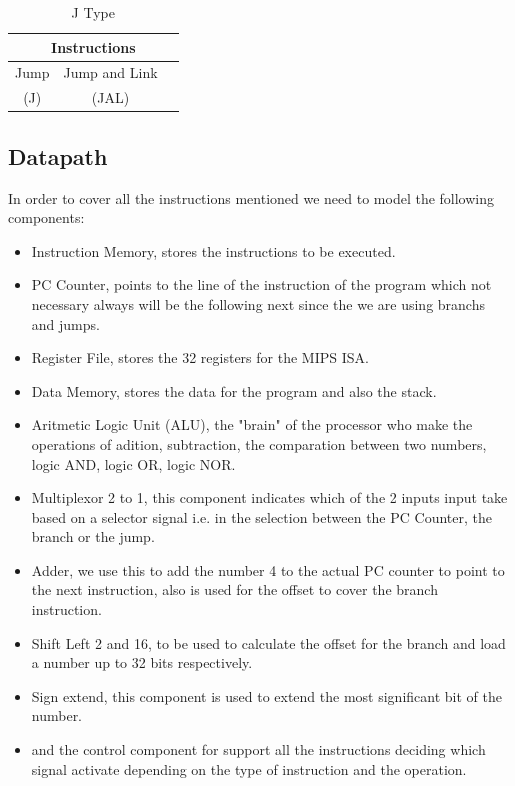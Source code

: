\documentclass[conference]{IEEEtran}
\begin{document}
\begin{table}[htbp]
\caption{J Type} %
\begin{center}
\begin{tabular}{|c|c|c|}
\hline
\multicolumn{3}{|c|}{\textbf{Instructions}} \\
\hline
Jump&Jump and Link&\\
(J) &(JAL)&\\
\hline
\end{tabular}
\label{tab_itype}
\end{center}
\end{table}
\subsection{Datapath}
In order to cover all the instructions mentioned we need to model the following components:

\begin{itemize}
\item Instruction Memory, stores the instructions to be executed.
\item PC Counter, points to the line of the instruction of the program which not 
necessary always will be the following next since the we are using branchs and
jumps.
\item Register File, stores the 32 registers for the MIPS ISA. 
\item Data Memory, stores the data for the program and also the stack.
\item Aritmetic Logic Unit (ALU), the "brain" of the processor who make the operations of
adition, subtraction, the comparation between two numbers, logic AND, logic OR, logic NOR.
\item Multiplexor 2 to 1, this component indicates which of the 2 inputs input take based on a 
selector signal i.e. in the selection between the PC Counter, the branch or the jump.
\item Adder, we use this to add the number 4 to the actual PC counter to point to the next 
instruction, also is used for the offset to cover the branch instruction.
\item Shift Left 2 and 16, to be used to calculate the offset for the branch and load a number 
up to 32 bits respectively.
\item Sign extend, this component is used to extend the most significant bit of the number.
\item and the control component for support all the instructions deciding which signal activate 
depending on the type of instruction and the operation.
\end{itemize}
\end{document}
